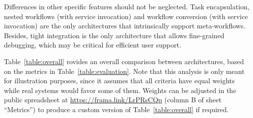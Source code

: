 \documentclass[preprint,3p,twocolumn]{elsarticle}
\newcommand{\todo}[2]{\pdfmargincomment[color=red,author=#1,open=true]{#2}}
\newcommand{\correction}[1]{\color{blue}#1\color{black}\xspace}
\begin{document}
Differences in other specific features should not be neglected. Task encapsulation, nested
workflows (with service invocation) and workflow conversion (with service
invocation) are the only architectures that intrinsically support meta-workflows. Besides,
tight integration is the only architecture that allows
fine-grained debugging, which may be
critical for efficient user support.

Table~\ref{table:overall} \todo{update with new architecture?} provides an overall comparison between
architectures, based on the metrics in Table~\ref{table:evaluation}.
Note that this analysis is only meant for illustration purposes, since
it assumes that all criteria have equal weights while real systems
would favor some of them. \correction{Weights can be adjusted in the
  public spreadsheet at \url{https://frama.link/LrPRsCQp} (column B of
  sheet ``Metrics'') to produce a custom version of
  Table~\ref{table:overall} if required.}
\end{document}
